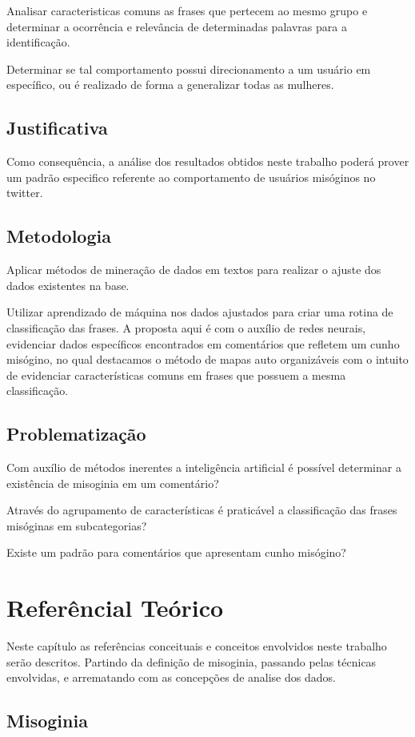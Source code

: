 \documentclass[
	12pt,				%
	openright,			%
	twoside,			%
	a4paper,			%
	english,			%
	french,				%
	spanish,			%
	brazil				%
	]{abntex2}
\begin{document}
Analisar caracteristicas comuns as frases que pertecem ao mesmo grupo e determinar a ocorrência e relevância de determinadas palavras para a identificação.

Determinar se tal comportamento possui direcionamento a um usuário em específico, ou é realizado de forma a generalizar todas as mulheres.

\section{Justificativa}
Como consequência, a análise dos resultados obtidos neste trabalho poderá prover um padrão especifico referente ao comportamento de usuários misóginos no twitter.

\section{Metodologia}
Aplicar métodos de mineração de dados em textos para realizar o ajuste dos dados existentes na base. 

Utilizar aprendizado de máquina nos dados ajustados para criar uma rotina de classificação das frases.
A proposta aqui é com o auxílio de redes neurais, evidenciar dados específicos encontrados em comentários que refletem um cunho misógino, no qual destacamos o método de mapas auto organizáveis com o intuito de evidenciar características comuns em frases que possuem a mesma classificação.


\section{Problematização}
Com auxílio de métodos inerentes a inteligência artificial é possível determinar a existência de misoginia em um comentário?

Através do agrupamento de características é praticável a classificação das frases misóginas em subcategorias?

Existe um padrão para comentários que apresentam cunho misógino? 
\chapter{Referêncial Teórico}
Neste capítulo as referências conceituais e  conceitos envolvidos neste trabalho serão descritos. Partindo da definição de misoginia, passando pelas técnicas envolvidas, e arrematando com as concepções de analise dos dados.
\section{Misoginia}
\end{document}
